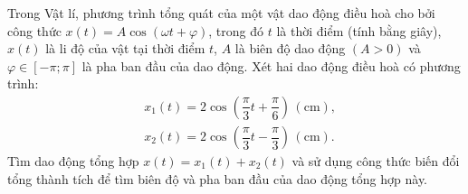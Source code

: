 \begin{bt}%
	Trong Vật lí, phương trình tổng quát của một vật dao động điều hoà cho bởi công thức $x(t)=A \cos (\omega t+\varphi)$, trong đó $t$ là thời điểm (tính bằng giây), $x(t)$ là li độ của vật tại thời điểm $t$, $A$ là biên độ dao động $(A>0)$ và $\varphi \in[-\pi ; \pi]$ là pha ban đầu của dao động. Xét hai dao động điều hoà có phương trình:
	$$
	\begin{aligned}
		& x_1(t)=2 \cos \left(\dfrac{\pi}{3} t+\dfrac{\pi}{6}\right)\,(\mathrm{cm}), \\
		& x_2(t)=2 \cos \left(\dfrac{\pi}{3} t-\dfrac{\pi}{3}\right)\,(\mathrm{cm}) .
	\end{aligned}
	$$
	Tìm dao động tổng hợp $x(t)=x_1(t)+x_2(t)$ và sử dụng công thức biến đổi tổng thành tích để tìm biên độ và pha ban đầu của dao động tổng hợp này.
\end{bt}

